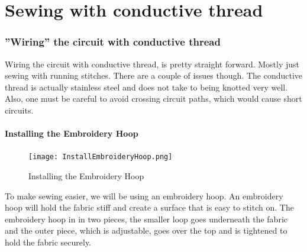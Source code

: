 \documentclass[letterpaper,twoside,12pt]{article}
\begin{document}
\part{Sewing with conductive thread}
\section{''Wiring'' the circuit with conductive thread}
Wiring the circuit with conductive thread, is pretty straight forward.  Mostly 
just sewing with running stitches.  There are a couple of issues though.  The 
conductive thread is actually stainless steel and does not take to being 
knotted very well.  Also, one must be careful to avoid crossing circuit paths, 
which would cause short circuits.
\subsection{Installing the Embroidery Hoop}
\begin{figure}[hbpt]\begin{centering}%
\texttt{[image: InstallEmbroideryHoop.png]}
\caption{Installing the Embroidery Hoop}
\label{fig:installembroideryhoop}
\end{centering}\end{figure}
To make sewing easier, we will be using an embroidery hoop.  An embroidery 
hoop will hold the fabric stiff and create a surface that is easy to stitch
on.  The embroidery hoop in in two pieces, the smaller loop goes underneath 
the fabric and the outer piece, which is adjustable, goes over the top and is 
tightened to hold the fabric securely.
\end{document}

